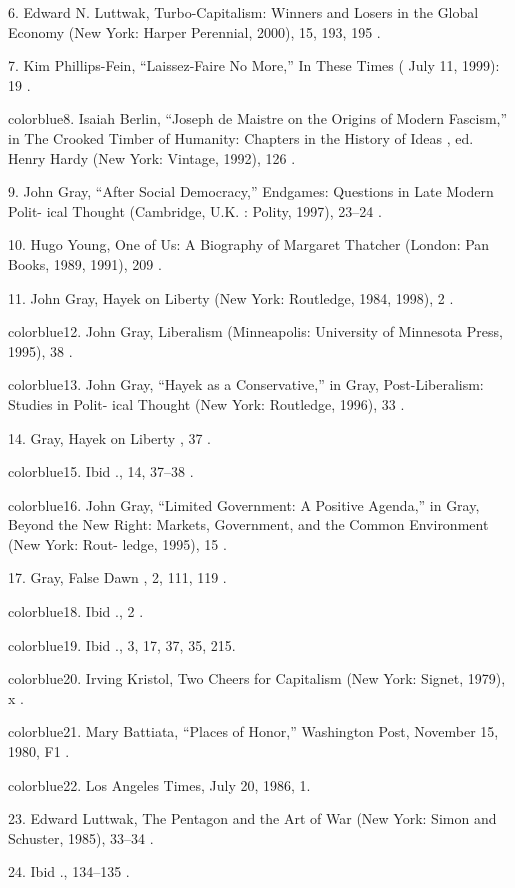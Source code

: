 	{\color{blue}6}. Edward N. Luttwak, Turbo-Capitalism: Winners and Losers in the Global Economy (New York: Harper Perennial, 2000), 15, 193, 195 .


	{\color{blue}7}. Kim Phillips-Fein, “Laissez-Faire No More,” In These Times ( July 11, 1999): 19 .


	{color{blue}8}. Isaiah Berlin, “Joseph de Maistre on the Origins of Modern Fascism,” in The Crooked Timber of Humanity: Chapters in the History of Ideas , ed. Henry Hardy (New York: Vintage, 1992), 126 .


	{\color{blue}9}. John Gray, “After Social Democracy,” Endgames: Questions in Late Modern Polit- ical Thought (Cambridge, U.K. : Polity, 1997), 23–24 .


	{\color{blue}10}. Hugo Young, One of Us: A Biography of Margaret Thatcher (London: Pan Books, 1989, 1991), 209 .


	{\color{blue}11}. John Gray, Hayek on Liberty (New York: Routledge, 1984, 1998), 2 .


	{color{blue}12}. John Gray, Liberalism (Minneapolis: University of Minnesota Press, 1995), 38 .


	{color{blue}13}. John Gray, “Hayek as a Conservative,” in Gray, Post-Liberalism: Studies in Polit- ical Thought (New York: Routledge, 1996), 33 .


	{\color{blue}14}. Gray, Hayek on Liberty , 37 .


	{color{blue}15}. Ibid ., 14, 37–38 .


	{color{blue}16}. John Gray, “Limited Government: A Positive Agenda,” in Gray, Beyond the New Right: Markets, Government, and the Common Environment (New York: Rout- ledge, 1995), 15 .


	{\color{blue}17}. Gray, False Dawn , 2, 111, 119 .


	{color{blue}18}. Ibid ., 2 .


	{color{blue}19}. Ibid ., 3, 17, 37, 35, 215.


	{color{blue}20}. Irving Kristol, Two Cheers for Capitalism (New York: Signet, 1979), x .


	{color{blue}21}. Mary Battiata, “Places of Honor,” Washington Post, November 15, 1980, F1 .


	{color{blue}22}. Los Angeles Times, July 20, 1986, 1.


	{\color{blue}23}. Edward Luttwak, The Pentagon and the Art of War (New York: Simon and Schuster, 1985), 33–34 .


	{\color{blue}24}. Ibid ., 134–135 .



